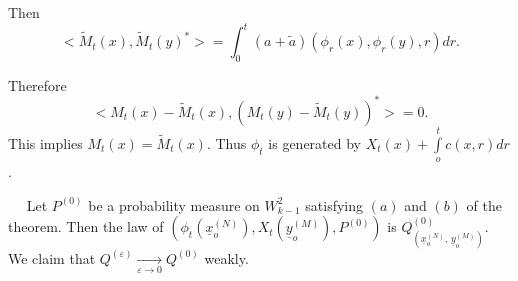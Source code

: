 Then 
$$
< \tilde{M}_t (x), \tilde{M}_t (y)^* > = \int^t_0 (a +  \tilde{a}) 
(\phi_r (x), \phi_r (y), r) dr. 
$$

Therefore\pageoriginale 
$$
< M_t (x)- \tilde{M}_t (x), (M_t(y) - \tilde{M}_t(y))^* > = 0.
$$
This implies $M_t(x) = \tilde{M}_t (x)$. Thus  $\phi_t$ is generated
by $X_t(x) + \int\limits_{o}^t c(x,r) dr$.  


\smallskip
{}~~
 Let $P^{(0)}$ be a probability measure on
  $W^2_{k-1}$ satisfying $(a)$ and $(b)$ of the theorem. Then  the law
  of $(\phi_t(\underline{x}_o^{(N)}),
  X_t(\underline{y}_o^{(M)}) , P^{(0)})$ is
  $Q^{(0)}_{(\underline{x}_o^{(N)}, \, \underline{y}_o^{(M)})}$. We claim
  that $Q^{(\varepsilon)} \xrightarrow[\varepsilon \to 0]{} Q^{(0)}$
  weakly.   

